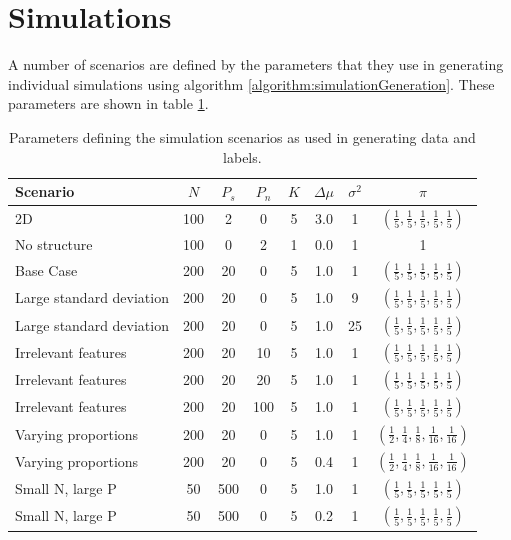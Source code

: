 \documentclass[]{article}
\begin{document}
\section{Simulations} \label{sec:simulations}
A number of scenarios are defined by the parameters that they use in generating individual simulations using algorithm \ref{algorithm:simulationGeneration}. These parameters are shown in table \ref{table:scenarioTable}.
\begin{table}[ht]
	\centering
	\begin{tabular}{|l|ccccccc|}
	\hline
	\textbf{Scenario} & $N$ & $P_s$ & $P_n$ & $K$ & $\Delta\mu$ & $\sigma^2$ & $\pi$\\
	\hline 
	2D & 100 & 2 & 0 & 5 & 3.0 & 1 &  $(\frac{1}{5} , \frac{1}{5}, \frac{1}{5}, \frac{1}{5}, \frac{1}{5})$ \\
	No structure & 100 & 0 & 2 & 1 & 0.0 & 1 & 1 \\
	Base Case & 200 & 20 & 0 & 5 & 1.0 & 1 &  $(\frac{1}{5} , \frac{1}{5}, \frac{1}{5}, \frac{1}{5}, \frac{1}{5})$\\
	Large standard deviation & 200 & 20 & 0 & 5 & 1.0 & 9 & $(\frac{1}{5} , \frac{1}{5}, \frac{1}{5}, \frac{1}{5}, \frac{1}{5})$ \\
	Large standard deviation & 200 & 20 & 0 & 5 & 1.0 & 25 &  $(\frac{1}{5} , \frac{1}{5}, \frac{1}{5}, \frac{1}{5}, \frac{1}{5})$\\
	Irrelevant features & 200 & 20 & 10 & 5 & 1.0 & 1 &  $(\frac{1}{5} , \frac{1}{5}, \frac{1}{5}, \frac{1}{5}, \frac{1}{5})$\\
	Irrelevant features & 200 & 20 & 20 & 5 & 1.0 & 1 &  $(\frac{1}{5} , \frac{1}{5}, \frac{1}{5}, \frac{1}{5}, \frac{1}{5})$\\
	Irrelevant features & 200 & 20 & 100 & 5 & 1.0 & 1 &  $(\frac{1}{5} , \frac{1}{5}, \frac{1}{5}, \frac{1}{5}, \frac{1}{5})$\\
	Varying proportions & 200 & 20 & 0 & 5 & 1.0 & 1 & $(\frac{1}{2} , \frac{1}{4}, \frac{1}{8}, \frac{1}{16}, \frac{1}{16})$ \\
	Varying proportions & 200 & 20 & 0 & 5 & 0.4 & 1 &  $(\frac{1}{2} , \frac{1}{4}, \frac{1}{8}, \frac{1}{16}, \frac{1}{16})$ \\ %
	Small N, large P & 50 & 500 & 0 & 5 & 1.0 & 1 &  $(\frac{1}{5} , \frac{1}{5}, \frac{1}{5}, \frac{1}{5}, \frac{1}{5})$\\
	Small N, large P & 50 & 500 & 0 & 5 & 0.2 & 1 &  $(\frac{1}{5} , \frac{1}{5}, \frac{1}{5}, \frac{1}{5}, \frac{1}{5})$
	\\
	\hline
	\end{tabular}
	\caption{Parameters defining the simulation scenarios as used in generating data and labels.}
	\label{table:scenarioTable}
\end{table}%
\end{document}
